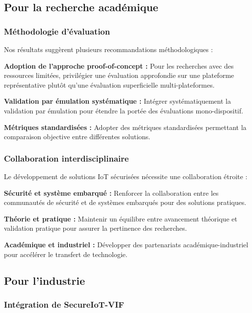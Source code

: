 \subsection{Pour la recherche académique}

\subsubsection{Méthodologie d'évaluation}

Nos résultats suggèrent plusieurs recommandations méthodologiques :

\textbf{Adoption de l'approche proof-of-concept :} Pour les recherches avec des ressources limitées, privilégier une évaluation approfondie sur une plateforme représentative plutôt qu'une évaluation superficielle multi-plateformes.

\textbf{Validation par émulation systématique :} Intégrer systématiquement la validation par émulation pour étendre la portée des évaluations mono-dispositif.

\textbf{Métriques standardisées :} Adopter des métriques standardisées permettant la comparaison objective entre différentes solutions.

\subsubsection{Collaboration interdisciplinaire}

Le développement de solutions IoT sécurisées nécessite une collaboration étroite :

\textbf{Sécurité et système embarqué :} Renforcer la collaboration entre les communautés de sécurité et de systèmes embarqués pour des solutions pratiques.

\textbf{Théorie et pratique :} Maintenir un équilibre entre avancement théorique et validation pratique pour assurer la pertinence des recherches.

\textbf{Académique et industriel :} Développer des partenariats académique-industriel pour accélérer le transfert de technologie.

\subsection{Pour l'industrie}

\subsubsection{Intégration de SecureIoT-VIF}

